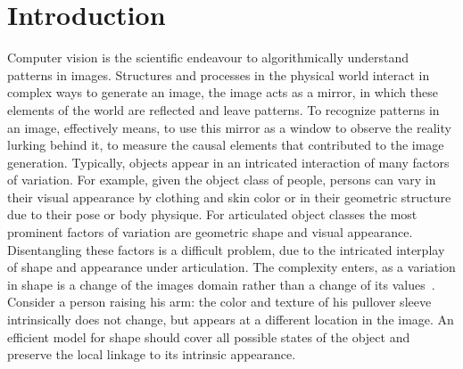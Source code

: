 \chapter{Introduction}
	Computer vision is the scientific endeavour to algorithmically understand patterns in images.
	Structures and processes in the physical world interact in complex ways to generate an image, the image acts as a mirror, in which these elements of the world are reflected and leave patterns.
	To recognize patterns in an image, effectively means, to use this mirror as a window to observe the reality lurking behind it, \ie to measure the causal elements that contributed to the image generation.
	Typically, objects appear in an intricated interaction of many factors of variation. 
	For example, given the object class of people, persons can vary in their visual appearance by clothing and skin color or in their geometric structure due to their pose or body physique.
	For articulated object classes the most prominent factors of variation are geometric shape and visual appearance.
	Disentangling these factors is a difficult problem, due to the intricated interplay of shape and appearance under articulation.
	The complexity enters, as a variation in shape is a change of the images domain rather than a change of its values~\cite{Shu:2018ua}.
	Consider a person raising his arm: the color and texture of his pullover sleeve intrinsically does not change, but appears at a different location in the image. An efficient model for shape should cover all possible states of the object and preserve the local linkage to its intrinsic appearance.


